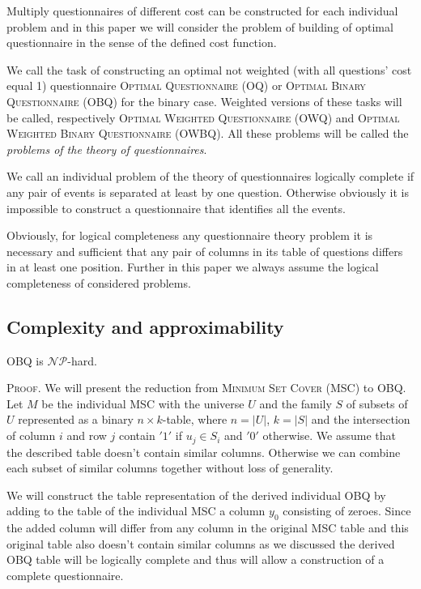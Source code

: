 \documentclass[11pt]{article}
\begin{document}
Multiply questionnaires of different cost can be constructed for each individual problem and in this paper we will consider the problem of building of optimal questionnaire in the sense of the defined cost function.

We call the task of constructing an optimal not weighted (with all questions' cost equal 1) questionnaire \textsc{Optimal Questionnaire} (OQ) or \textsc{Optimal Binary Questionnaire} (OBQ) for the binary case. Weighted versions of these tasks will be called, respectively \textsc{Optimal Weighted Questionnaire} (OWQ) and \textsc{Optimal Weighted Binary Questionnaire} (OWBQ). All these problems will be called the \emph{problems of the theory of questionnaires}.

We call an individual problem of the theory of questionnaires logically complete if any pair of events is separated at least by one question. Otherwise obviously it is impossible to construct a questionnaire that identifies all the events.

Obviously, for logical completeness any questionnaire theory problem it is necessary and sufficient that any pair of columns in its table of questions differs in at least one position. Further in this paper we always assume the logical completeness of considered problems. 

%
%
%
\subsection{Complexity and approximability}
\begin{Mystat} 
OBQ is $\mathcal{NP}$-hard.
\end{Mystat}\label{st:obq_np}
{\scshape Proof}. We will present the reduction from \textsc{Minimum Set Cover} (MSC) \cite{GJ} to OBQ. Let $M$ be the individual MSC with the universe $U$ and the family $S$ of subsets of $U$ represented as a binary $n \times k$-table, where $n=|U|$, $k=|S|$ and the intersection of column $i$ and row $j$ contain $'1'$ if $u_j \in S_i$ and $'0'$ otherwise. We assume that the described table doesn't contain similar columns. Otherwise we can combine each subset of similar columns together without loss of generality.

We will construct the table representation of the derived individual OBQ by adding to the table of the individual MSC a column $y_0$ consisting of zeroes. Since the added column will differ from any column in the original MSC table and this original table also doesn't contain similar columns as we discussed the derived OBQ table will be logically complete and thus will allow a construction of a complete questionnaire.
\end{document}
